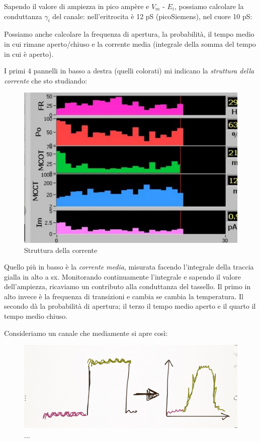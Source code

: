 \documentclass[a4paper,12pt]{article}
\begin{document}
Sapendo il valore di ampiezza in pico ampère e $V_{m}$ - $E_{i}$, possiamo calcolare la conduttanza $\gamma_{i}$ del canale: nell'eritrocita è 12 pS (picoSiemens), nel cuore 10 pS:

Possiamo anche calcolare la frequenza di apertura, la probabilità, il tempo medio in cui rimane aperto/chiuso e la corrente media (integrale della somma del tempo in cui è aperto). 

I primi 4 pannelli in basso a destra (quelli colorati) mi indicano la \emph{struttura della corrente} che sto studiando:
\begin{figure}[H]
\centering
\includegraphics[scale=0.4]{immagine/color.jpg}
\caption{Struttura della corrente}
\end{figure} 
Quello più in basso è la \emph{corrente media}, misurata facendo l'integrale della traccia gialla in alto a sx. Monitorando continuamente l'integrale e sapendo il valore dell'ampiezza, ricaviamo un contributo alla conduttanza del tassello. Il primo in alto invece è la frequenza di transizioni e cambia se cambia la temperatura.
Il secondo dà la probabilità di apertura; il terzo il tempo medio aperto e il quarto il tempo medio chiuso.

Consideriamo un canale che mediamente si apre così:
\begin{figure}[H]
\centering
\includegraphics[scale=0.1]{immagine/9.jpg}
\caption{...}
\end{figure} 
\end{document}
